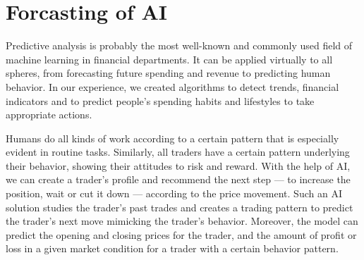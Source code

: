 \documentclass[	DIV=calc,%
							paper=a4,%
							fontsize=11pt,%
							twocolumn]{scrartcl}	 					%
\begin{document}
\section*{Forcasting of AI}
Predictive analysis is probably the most well-known and commonly used field of machine learning in financial departments. It can be applied virtually to all spheres, from forecasting future spending and revenue to predicting human behavior. In our experience, we created algorithms to detect trends, financial indicators and to predict people’s spending habits and lifestyles to take appropriate actions.\par
Humans do all kinds of work according to a certain pattern that is especially evident in routine tasks. Similarly, all traders have a certain pattern underlying their behavior, showing their attitudes to risk and reward. With the help of AI, we can create a trader’s profile and recommend the next step — to increase the position, wait or cut it down — according to the price movement. Such an AI solution studies the trader’s past trades and creates a trading pattern to predict the trader’s next move mimicking the trader’s behavior. Moreover, the model can predict the opening and closing prices for the trader, and the amount of profit or loss in a given market condition for a trader with a certain behavior pattern.



\end{document}

